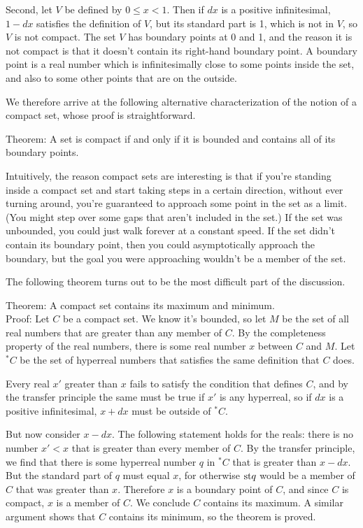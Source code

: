 Second, let $V$ be defined by $0 \le x < 1$. Then if $dx$ is a positive infinitesimal,
$1-dx$ satisfies the definition of $V$, but its standard part is 1, which is not in $V$, so $V$
is not compact. The set $V$ has boundary points at 0 and 1, and the reason it is not compact
is that it doesn't contain its right-hand boundary point. A boundary point
is a real number which is infinitesimally close to some points inside the set, and also to some
other points that are on the outside.

We therefore arrive at the following alternative characterization of the notion of a compact
set, whose proof is straightforward.

Theorem: A set is compact if and only if it is bounded and contains all of its boundary points.

Intuitively, the reason compact sets are interesting is that if you're standing inside a compact
set and start taking steps in a certain direction, without ever turning around, you're guaranteed to
approach some point in the set as a limit. (You might step over some gaps that aren't included in the set.)
If the set was unbounded, you could just walk forever at a constant speed.
If the set didn't contain its boundary point, then you could asymptotically approach the boundary, but
the goal you were approaching wouldn't be a member of the set.

The following theorem turns out to be the most difficult part of the discussion.

Theorem: A compact set contains its maximum and minimum.\\
Proof: Let $C$ be a compact set. We know it's bounded, so let $M$ be the set of all real numbers
that are greater than any member of $C$. By the completeness property of the real
numbers, there is some real number $x$ between $C$ and $M$. Let $^{*}C$ be the set of hyperreal numbers that satisfies the same
definition that $C$ does.

Every real $x'$ greater than $x$ fails
to satisfy the condition that defines $C$, and by the transfer principle the same must be true if $x'$ is any hyperreal,
so if $dx$ is a positive infinitesimal, $x+dx$ must be outside of $^{*}C$. 

But now consider $x-dx$.
The following statement holds for the reals: there is no number $x'<x$ that is greater than every
member of $C$. By the transfer principle, we find that there is some hyperreal number $q$ in $^{*}C$
that is greater than $x-dx$. But the standard part of $q$ must equal $x$, for otherwise $\textup{st} q$ would
be a member of $C$ that was greater than $x$.
Therefore $x$ is a boundary point of $C$, and since
$C$ is compact, $x$ is a member of $C$. We conclude $C$ contains its maximum. A similar argument shows that
$C$ contains its minimum, so the theorem is proved.

